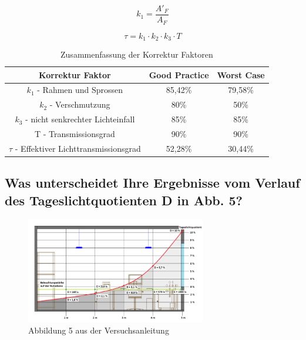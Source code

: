 \begin{equation}
    k_1 = \frac{A'_F}{A_F}
    \label{eq:230624_k1}
\end{equation}

\begin{equation}
    \tau = k_1 \cdot k_2 \cdot k_3 \cdot T
    \label{eq:230624_Lichttransmissionsgrad}
\end{equation}


\begin{table}[H]
    \caption{Zusammenfassung der Korrektur Faktoren}
    \centering
    \begin{tabular}{|c|c|c|}
    \hline
    \rowcolor[HTML]{70AD47} 
    Korrektur Faktor                                & Good Practice & Worst Case \\\hline
    \rowcolor[HTML]{CFE5A8} 
    $k_1$ - Rahmen und Sprossen                     & 85,42\%       & 79,58\%    \\\hline
    \rowcolor[HTML]{A9D08E} 
    $k_2$ - Verschmutzung                           & 80\%          & 50\%       \\\hline
    \rowcolor[HTML]{CFE5A8} 
    $k_3$ - nicht senkrechter Lichteinfall          & 85\%          & 85\%       \\\hline
    \rowcolor[HTML]{A9D08E} 
    T - Transmissionsgrad                           & 90\%          & 90\%       \\\hline
    \rowcolor[HTML]{CFE5A8} 
    $\tau$ - Effektiver Lichttransmissionsgrad      & 52,28\%       & 30,44\%   \\\hline
    \end{tabular}
    \label{tab:230426_Korrektur-Faktoren}
\end{table}

\subsection{Was unterscheidet Ihre Ergebnisse vom Verlauf des Tageslichtquotienten D in Abb. 5?}


\begin{figure}[H]
    \centering
    \includegraphics[width=0.7\textwidth]{Abbildungen/abb5.png}
    \caption{Abbildung 5 aus der Versuchsanleitung }
    \label{fig:abb5}
\end{figure}


